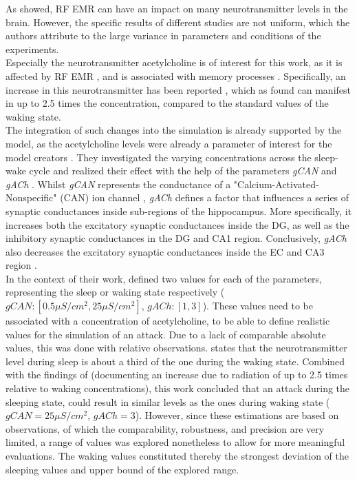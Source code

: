     As \textcite{Hu.2021} showed, RF EMR can have an impact on many neurotransmitter levels in the brain. However, the specific results of different studies are not uniform, which the authors attribute to the large variance in parameters and conditions of the experiments.\\
    Especially the neurotransmitter acetylcholine is of interest for this work, as it is affected by RF EMR \cite{Hu.2021} \cite{Fujiwara.1978}, and is associated with memory processes \cite{Aussel.2018}. Specifically, an increase in this neurotransmitter has been reported \cite{Hu.2021}, which as \textcite{Fujiwara.1978} found can manifest in up to 2.5 times the concentration, compared to the standard values of the waking state.\\
    The integration of such changes into the simulation is already supported by the model, as the acetylcholine levels were already a parameter of interest for the model creators \cite{Aussel.2018}. They investigated the varying concentrations across the sleep-wake cycle and realized their effect with the help of the parameters \textit{gCAN} and \textit{gACh} \cite{HippSimModel.2}. Whilst \textit{gCAN} represents the conductance of a "Calcium-Activated-Nonspecific" (CAN) ion channel \cite{Aussel.2018}, \textit{gACh} defines a factor that influences a series of synaptic conductances inside sub-regions of the hippocampus. More specifically, it increases both the excitatory synaptic conductances inside the DG, as well as the inhibitory synaptic conductances in the DG and CA1 region. Conclusively, \textit{gACh} also decreases the excitatory synaptic conductances inside the EC and CA3 region \cite{AmelieAussel.2020}.\\
    In the context of their work, \textcite{Aussel.2018} defined two values for each of the parameters, representing the sleep or waking state respectively (\(gCAN : [0.5\mu S/cm^2, 25\mu S/cm^2]\), \(gACh : [1, 3]\)). These values need to be associated with a concentration of acetylcholine, to be able to define realistic values for the simulation of an attack. Due to a lack of comparable absolute values, this was done with relative observations. \textcite{Hasselmo.1999} states that the neurotransmitter level during sleep is about a third of the one during the waking state. Combined with the findings of \textcite{Fujiwara.1978} (documenting an increase due to radiation of up to 2.5 times relative to waking concentrations), this work concluded that an attack during the sleeping state, could result in similar levels as the ones during waking state (\(gCAN = 25\mu S/cm^2\), \(gACh = 3\)). However, since these estimations are based on observations, of which the comparability, robustness, and precision are very limited, a range of values was explored nonetheless to allow for more meaningful evaluations. The waking values constituted thereby the strongest deviation of the sleeping values and upper bound of the explored range.
    

